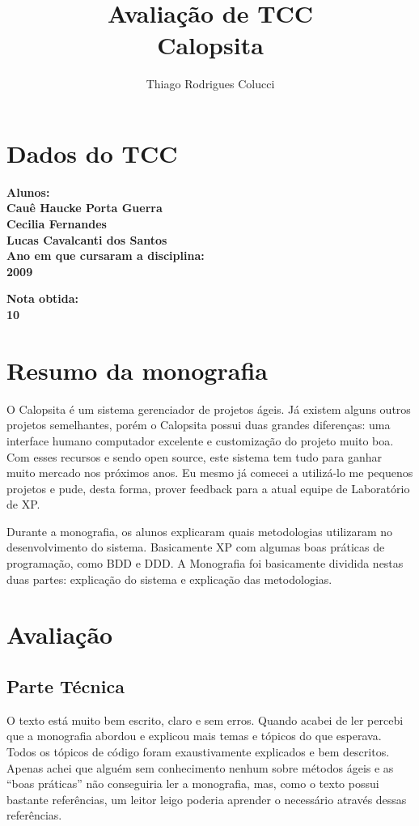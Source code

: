 \documentclass[12pt,a4paper]{article}
\title{Avaliação de TCC\\Calopsita}
\author{Thiago Rodrigues Colucci}
\begin{document}
\maketitle

\newpage

\tableofcontents
\newpage
\section{Dados do TCC}
\bf{Alunos:}\\
Cauê Haucke Porta Guerra\\
Cecilia Fernandes\\
Lucas Cavalcanti dos Santos\\


\bf{Ano em que cursaram a disciplina:}\\2009


\bf{Nota obtida:}\\10


\section{Resumo da monografia}

O Calopsita é um sistema gerenciador de projetos ágeis. Já existem alguns outros projetos semelhantes, porém o Calopsita possui duas grandes diferenças: uma interface humano computador excelente e customização do projeto muito boa. Com esses recursos e sendo open source, este sistema tem tudo para ganhar muito mercado nos próximos anos. Eu mesmo já comecei a utilizá-lo me pequenos projetos e pude, desta forma, prover feedback para a atual equipe de Laboratório de XP.

Durante a monografia, os alunos explicaram quais metodologias utilizaram no desenvolvimento do sistema. Basicamente XP com algumas boas práticas de programação, como BDD e DDD. A Monografia foi basicamente dividida nestas duas partes: explicação do sistema e explicação das metodologias.

\section{Avaliação}
\subsection{Parte Técnica}
O texto está muito bem escrito, claro e sem erros. Quando acabei de ler percebi que a monografia abordou e explicou mais temas e tópicos do que esperava. Todos os tópicos de código foram exaustivamente explicados e bem descritos. Apenas achei que alguém sem conhecimento nenhum sobre métodos ágeis e as ``boas práticas'' não conseguiria ler a monografia, mas, como o texto possui bastante referências, um leitor leigo poderia aprender o necessário através dessas referências.
\end{document}
